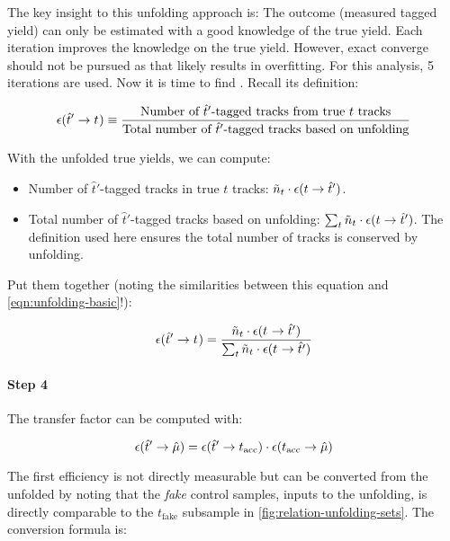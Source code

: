 The key insight to this unfolding approach is:
The outcome (measured tagged yield) can only be estimated with a good knowledge
of the true yield.
Each iteration improves the knowledge on the true yield.
However, exact converge should not be pursued as that likely results in
overfitting.
For this analysis, 5 iterations are used.
Now it is time to find . Recall its definition:

\begin{equation}
    \misEff[\hat{t}']{t^{\phantom{}}} \equiv
        \frac{
            \text{Number of $\hat{t}'$-tagged tracks from true $t$ tracks}
        }{
            \text{Total number of $\hat{t}'$-tagged tracks based on unfolding}
        }
\end{equation}

With the unfolded true yields, we can compute:

\begin{itemize}
    \item Number of $\hat{t}'$-tagged tracks in true $t$ tracks:
        $\tilde{n}_t \cdot \misEff[t]{\hat{t}'}$.
    \item Total number of $\hat{t}'$-tagged tracks based on unfolding:
        $\sum_t \tilde{n}_t \cdot \misEff[t]{\hat{t}'}$.
        The definition used here ensures the total number of tracks is
        conserved by unfolding.
\end{itemize}

Put them together (noting the similarities between this equation and
\cref{eqn:unfolding-basic}!):

\begin{equation}
    \misEff[\hat{t}']{t^{\phantom{}}} =
        \frac{
            \tilde{n}_t \cdot \misEff[t^{\phantom{}}]{\hat{t}'}
        }{
            \sum_t \tilde{n}_t \cdot \misEff[t^{\phantom{}}]{\hat{t}'}
        }
\end{equation}

\paragraph{Step 4}
The transfer factor \misEff[\hat{t}']{\hat{\mu}}
can be computed with:

\begin{equation}
    \misEff[\hat{t}']{\hat{\mu}} =
        \misEff[\hat{t}']{t_\text{acc}} \cdot \misEff[t_\text{acc}]{\hat{\mu}}
\end{equation}

The first efficiency  is not directly measurable
but can be converted from the unfolded 
by noting that the \emph{fake} \muon control samples,
inputs to the unfolding,
is directly comparable to the $t_\text{fake}$ subsample
in \cref{fig:relation-unfolding-sets}.
The conversion formula is:

